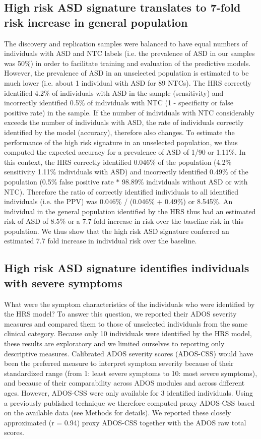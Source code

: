 \documentclass[9pt,lineno]{elife}
\begin{document}
\subsection{High risk ASD signature translates to 7-fold risk increase in general population}
The discovery and replication samples were balanced to have equal numbers of individuals with ASD and NTC labels (i.e. the prevalence of ASD in our samples was 50\%) in order to facilitate training and evaluation of the predictive models. However, the prevalence of ASD in an unselected population is estimated to be much lower (i.e. about 1 individual with ASD for 89 NTCs). The HRS correctly identified 4.2\% of individuals with ASD in the sample (sensitivity) and incorrectly identified 0.5\% of individuals with NTC (1 - specificity or false positive rate) in the sample. If the number of individuals with NTC considerably exceeds the number of individuals with ASD, the rate of individuals correctly identified by the model (accuracy), therefore also changes. To estimate the performance of the high risk signature in an unselected population, we thus computed the expected accuracy for a prevalence of ASD of 1/90 or 1.11\%. In this context, the HRS correctly identified 0.046\% of the population (4.2\% sensitivity  1.11\% individuals with ASD) and incorrectly identified 0.49\% of the population (0.5\% false positive rate $*$ 98.89\% individuals without ASD or with NTC). Therefore the ratio of correctly identified individuals to all identified individuals (i.e. the PPV) was 0.046\% / (0.046\% $+$ 0.49\%) or 8.545\%. An individual in the general population identified by the HRS thus had an estimated risk of ASD of 8.5\% or a 7.7 fold increase in risk over the baseline risk in this population. We thus show that the high risk ASD signature conferred an estimated 7.7 fold increase in individual risk over the baseline.

\subsection{High risk ASD signature identifies individuals with severe symptoms}
What were the symptom characteristics of the individuals who were identified by the HRS model? To answer this question, we reported their ADOS severity measures and compared them to those of unselected individuals from the same clinical category. Because only 10 individuals were identified by the HRS model, these results are exploratory and we limited ourselves to reporting only descriptive measures. Calibrated ADOS severity scores (ADOS-CSS) would have been the preferred measure to interpret symptom severity because of their standardized range (from 1: least severe symptoms to 10: most severe symptoms), and because of their comparability across ADOS modules and across different ages. However, ADOS-CSS were only available for 3 identified individuals. Using a previously published technique we therefore computed proxy ADOS-CSS based on the available data (see Methods for details). We reported these closely approximated (r = 0.94) proxy ADOS-CSS together with the ADOS raw total scores.
\end{document}
